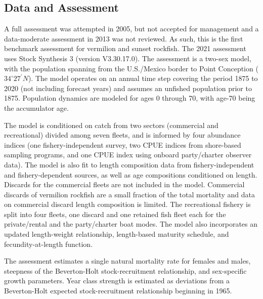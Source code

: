 \documentclass[11pt,
  english,
]{article}
\begin{document}
\FloatBarrier


\hypertarget{data-and-assessment}{%
\subsection*{Data and Assessment}\label{data-and-assessment}}

\leavevmode\tagmcend\tagstructend

A full assessment was attempted in 2005, but not accepted for management and a data-moderate assessment in 2013 was not reviewed. As such, this is the first benchmark assessment for vermilion and sunset rockfish. The 2021 assessment uses Stock Synthesis 3 (version V3.30.17.0). The assessment is a two-sex model, with the population spanning from the U.S./Mexico border to Point Conception ($34^\circ 27^\prime N$). The model operates on an annual time step covering the period 1875 to 2020 (not including forecast years) and assumes an unfished population prior to 1875. Population dynamics are modeled for ages 0 through 70, with age-70 being the accumulator age.

The model is conditioned on catch from two sectors (commercial and recreational) divided among seven fleets, and is informed by four abundance indices (one fishery-independent survey, two CPUE indices from shore-based sampling programs, and one CPUE index using onboard party/charter observer data). The model is also fit to length composition data from fishery-independent and fishery-dependent sources, as well as age compositions conditioned on length. Discards for the commercial fleets are not included in the model. Commercial discards of vermilion rockfish are a small fraction of the total mortality and data on commercial discard length composition is limited. The recreational fishery is split into four fleets, one discard and one retained fish fleet each for the private/rental and the party/charter boat modes. The model also incorporates an updated length-weight relationship, length-based maturity schedule, and fecundity-at-length function.

The assessment estimates a single natural mortality rate for females and males, steepness of the Beverton-Holt stock-recruitment relationship, and sex-specific growth parameters. Year class strength is estimated as deviations from a Beverton-Holt expected stock-recruitment relationship beginning in 1965.
\end{document}
